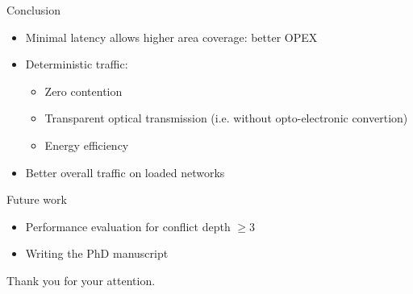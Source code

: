 \documentclass[10 pt]{beamer}
\begin{document}
  \begin{frame}{Conclusion}
  \begin{itemize}
   \item Minimal latency allows higher area coverage: better OPEX
   \item Deterministic traffic:
     \begin{itemize}
   \item Zero contention
   \item Transparent optical transmission (i.e. without opto-electronic convertion)
   \item Energy efficiency 
  \end{itemize}
  \item Better overall traffic on loaded networks
  \end{itemize}

  \vspace{1cm}
  \pause
  Future work
\begin{itemize}
 \item Performance evaluation for conflict depth $\geq 3$
 \item Writing the PhD manuscript
\end{itemize}
 

\pause
\hspace{2cm}\huge{Thank you for your attention.}
  

\end{frame}
\end{document}
